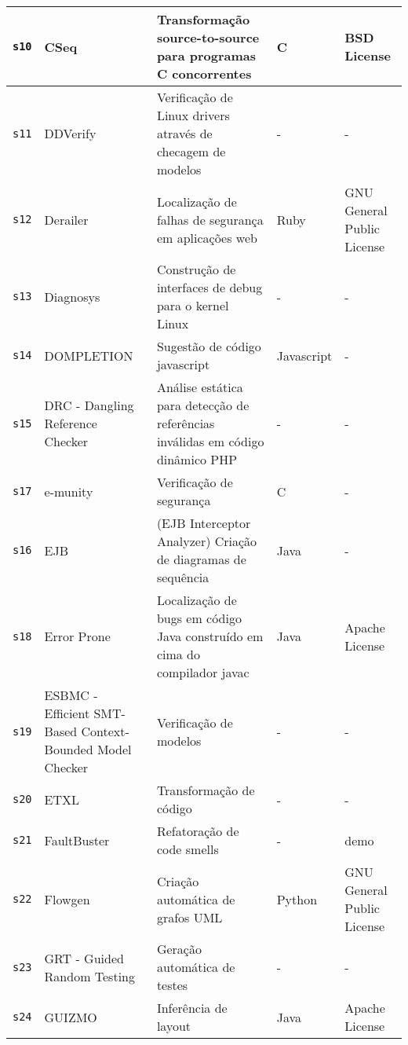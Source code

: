 \begin{longtable}{| l | p{4.5cm} | p{7cm} | p{2.5cm} | p{2.5cm} |}
    \hline
    \texttt{s10} &
      CSeq &
      Transformação source-to-source para programas C concorrentes &
      C &
      BSD License \\
    \hline
    \texttt{s11} &
      DDVerify &
      Verificação de Linux drivers através de checagem de modelos &
      - &
      - \\
    \hline
    \texttt{s12} &
      Derailer &
      Localização de falhas de segurança em aplicações web &
      Ruby &
      GNU General Public License \\
    \hline
    \texttt{s13} &
      Diagnosys &
      Construção de interfaces de debug para o kernel Linux &
      - &
      - \\
    \hline
    \texttt{s14} &
      DOMPLETION &
      Sugestão de código javascript &
      Javascript &
      - \\
    \hline
    \texttt{s15} &
      DRC - Dangling Reference Checker &
      Análise estática para detecção de referências inválidas em código dinâmico PHP &
      - &
      - \\
    \hline
    \texttt{s17} &
      e-munity &
      Verificação de segurança &
      C &
      - \\
    \hline
    \texttt{s16} &
      EJB &
      (EJB Interceptor Analyzer) Criação de diagramas de sequência &
      Java &
      - \\
    \hline
    \texttt{s18} &
      Error Prone &
      Localização de bugs em código Java construído em cima do compilador javac &
      Java &
      Apache License \\
    \hline
    \texttt{s19} &
      ESBMC - Efficient SMT-Based Context-Bounded Model Checker &
      Verificação de modelos &
      - &
      - \\
    \hline
    \texttt{s20} &
      ETXL &
      Transformação de código &
      - &
      - \\
    \hline
    \texttt{s21} &
      FaultBuster &
      Refatoração de code smells &
      - &
      demo \\
    \hline
    \texttt{s22} &
      Flowgen &
      Criação automática de grafos UML &
      Python &
      GNU General Public License \\
    \hline
    \texttt{s23} &
      GRT - Guided Random Testing &
      Geração automática de testes &
      - &
      - \\
    \hline
    \texttt{s24} &
      GUIZMO &
      Inferência de layout &
      Java &
      Apache License \\
    \hline

\end{longtable}
